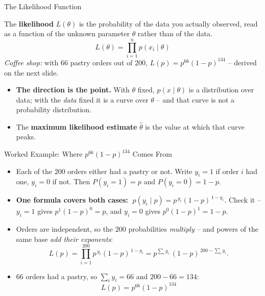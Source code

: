 \begin{frame}{The Likelihood Function}
\begin{rldefinition}
The \textbf{likelihood} $L(\theta)$ is the probability of the data you actually observed, read as a function of the unknown parameter $\theta$ rather than of the data.
\[
L(\theta) = \prod_{i=1}^{n} p(x_i \mid \theta)
\]
\emph{Coffee shop:} with $66$ pastry orders out of $200$, $L(p) = p^{66}(1-p)^{134}$ -- derived on the next slide.
\end{rldefinition}
\pause
\begin{itemize}
  \item \textbf{The direction is the point.} With $\theta$ fixed, $p(x \mid \theta)$ is a distribution over data; with the \emph{data} fixed it is a curve over $\theta$ -- and that curve is not a probability distribution.
  \pause
  \item The \textbf{maximum likelihood estimate} $\hat{\theta}$ is the value at which that curve peaks.
\end{itemize}
\end{frame}

\begin{frame}{Worked Example: Where $p^{66}(1-p)^{134}$ Comes From}
\small
\setlength{\abovedisplayskip}{5pt}\setlength{\belowdisplayskip}{5pt}
\begin{itemize}
  \item Each of the $200$ orders either had a pastry or not. Write $y_i = 1$ if order $i$ had one, $y_i = 0$ if not. Then $P(y_i = 1) = p$ and $P(y_i = 0) = 1-p$.
  \pause
  \item \textbf{One formula covers both cases:} $\;p(y_i \mid p) = p^{\,y_i}(1-p)^{\,1-y_i}$. Check it -- $y_i = 1$ gives $p^1(1-p)^0 = p$, and $y_i = 0$ gives $p^0(1-p)^1 = 1-p$.
  \pause
  \item Orders are independent, so the $200$ probabilities \emph{multiply} -- and powers of the same base \emph{add their exponents}:
  \[
    L(p) = \prod_{i=1}^{200} p^{\,y_i}(1-p)^{\,1-y_i}
         = p^{\sum_i y_i}\,(1-p)^{\,200 - \sum_i y_i}.
  \]
  \pause
  \item $66$ orders had a pastry, so $\sum_i y_i = 66$ and $200 - 66 = 134$:
  \[
    \boxed{\;L(p) = p^{66}(1-p)^{134}\;}
  \]
\vspace{-0.6em}
\end{itemize}
\end{frame}

